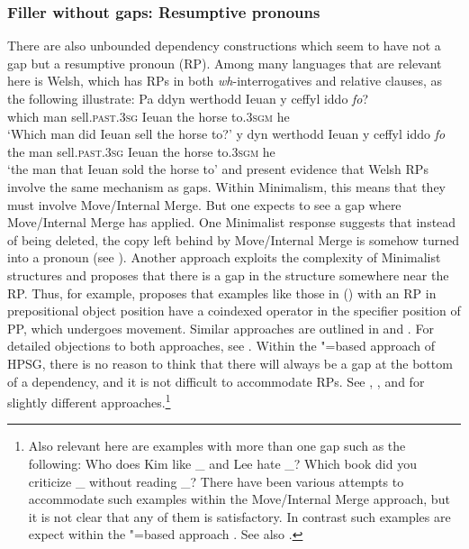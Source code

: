 \documentclass[output=paper]{langsci/langscibook}
\begin{document}
\subsubsection{Filler without gaps: Resumptive pronouns}

There are also unbounded dependency constructions which seem to have not a gap but a resumptive pronoun (RP). Among many languages that are relevant here is Welsh, which has RPs in both \emph{wh}-interrogatives and relative clauses, as the following illustrate:
\eal
\ex
\gll Pa	ddyn werthodd Ieuan y ceffyl iddo \emph{fo}?\\
     which man sell.\textsc{past}.\textsc{3sg} Ieuan the horse to.\textsc{3sgm} he\\
\glt`Which man did Ieuan sell the horse to?'
\ex 
\gll y dyn werthodd Ieuan y ceffyl iddo \emph{fo}\\
the man sell.\textsc{past}.\textsc{3sg} Ieuan the horse to.\textsc{3sgm} he\\
\glt`the man that Ieuan sold the horse to'
\zl
\citet{Willis.2011} and \citet{Borsley.2010,Borsley2013a-u} present evidence that Welsh RPs involve
the same mechanism as gaps. Within Minimalism, this means that they must involve Move/Internal
Merge. But one expects to see a gap where Move/Internal Merge has applied. One Minimalist response
suggests that instead of being deleted, the copy left behind by Move/Internal Merge is somehow
turned into a pronoun (see \citealt{McCloskey.2006}). Another approach exploits the complexity of
Minimalist structures and proposes that there is a gap in the structure somewhere near the RP.
Thus, for example, \citet{Willis.2011} proposes that examples like those in () with an RP in
prepositional object position have a coindexed operator in the specifier position of PP, which
undergoes movement. Similar approaches are outlined in \citet{AounChoueiriHornstein2001a-u} and
\citet{Boeckx.2003}. For detailed objections to both approaches, see
\citet[Section~3]{Borsley2013a-u}. Within the \slasch"=based approach of HPSG, there is no reason to
think that there will always be a gap at the bottom of a dependency, and it is not difficult to
accommodate RPs. See \citet{Vaillette2001b}, \citet{Taghvaipour2010a-u}, \citet{Borsley2013a-u} and \citet{crysmann_b10fg,Crysmann2016a-u} for slightly
different approaches.\footnote{%
	Also relevant here are examples with more than one gap such as the following:
	\eal
	\ex	Who does Kim like \_ and Lee hate \_?
	\ex	Which book did you criticize \_ without reading \_?
	\zl
	There have been various attempts to accommodate such examples within the Move/Internal Merge
        approach, but it is not clear that any of them is satisfactory. In contrast such examples
        are expect within the \slasch"=based approach \citep{LS2003a-u}. See also \citep[Section~4.6]{ps2}.%
}
\end{document}
